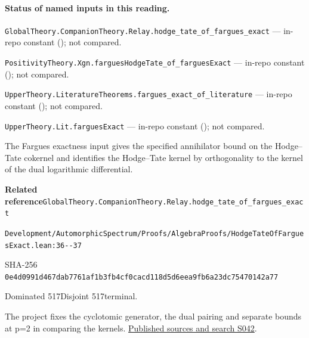 

\paragraph{Status of named inputs in this reading.}
\noindent\nolinkurl{GlobalTheory.CompanionTheory.Relay.hodge_tate_of_fargues_exact} --- in-repo constant (); not compared.\par
\noindent\nolinkurl{PositivityTheory.Xgn.farguesHodgeTate_of_farguesExact} --- in-repo constant (); not compared.\par
\noindent\nolinkurl{UpperTheory.LiteratureTheorems.fargues_exact_of_literature} --- in-repo constant (); not compared.\par
\noindent\nolinkurl{UpperTheory.Lit.farguesExact} --- in-repo constant (); not compared.\par

\begin{formalstatement}[D309]\label{decomp:D309}
The Fargues exactness input gives the specified annihilator bound on the Hodge–Tate cokernel and identifies the Hodge–Tate kernel by orthogonality to the kernel of the dual logarithmic differential.
\end{formalstatement}
{\small\raggedright\noindent\textsf{\bfseries Related reference}\quad \nolinkurl{GlobalTheory.CompanionTheory.Relay.hodge_tate_of_fargues_exact}\par\noindent \nolinkurl{Development/AutomorphicSpectrum/Proofs/AlgebraProofs/HodgeTateOfFarguesExact.lean:36--37}\par\noindent SHA-256 \nolinkurl{0e4d0991d467dab7761af1b3fb4cf0cacd118d5d6eea9fb6a23dc75470142a77}\par\noindent Dominated 517\quad Disjoint 517\quad terminal.\par}
The project fixes the cyclotomic generator, the dual pairing and separate bounds at p=2 in comparing the kernels.
\hyperref[lit:S042]{Published sources and search S042}.
